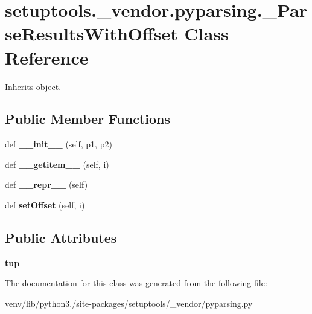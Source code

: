 \hypertarget{classsetuptools_1_1__vendor_1_1pyparsing_1_1___parse_results_with_offset}{}\section{setuptools.\+\_\+vendor.\+pyparsing.\+\_\+\+Parse\+Results\+With\+Offset Class Reference}
\label{classsetuptools_1_1__vendor_1_1pyparsing_1_1___parse_results_with_offset}


Inherits object.

\subsection*{Public Member Functions}
\begin{DoxyCompactItemize}
\item 
\mbox{\label{classsetuptools_1_1__vendor_1_1pyparsing_1_1___parse_results_with_offset_a42a6c67b4d51b835ad4c0813c7542af5}} 
def {\bfseries \+\_\+\+\_\+init\+\_\+\+\_\+} (self, p1, p2)
\item 
\mbox{\label{classsetuptools_1_1__vendor_1_1pyparsing_1_1___parse_results_with_offset_a96b0de38c14f63716fedf3e2b1ffe45e}} 
def {\bfseries \+\_\+\+\_\+getitem\+\_\+\+\_\+} (self, i)
\item 
\mbox{\label{classsetuptools_1_1__vendor_1_1pyparsing_1_1___parse_results_with_offset_a83e1743d828b7eba207b6bc011542792}} 
def {\bfseries \+\_\+\+\_\+repr\+\_\+\+\_\+} (self)
\item 
\mbox{\label{classsetuptools_1_1__vendor_1_1pyparsing_1_1___parse_results_with_offset_af3edd08a032755d17988cef4746177eb}} 
def {\bfseries set\+Offset} (self, i)
\end{DoxyCompactItemize}
\subsection*{Public Attributes}
\begin{DoxyCompactItemize}
\item 
\mbox{\label{classsetuptools_1_1__vendor_1_1pyparsing_1_1___parse_results_with_offset_a3426ca5b82d2d96f39d713952daa6201}} 
{\bfseries tup}
\end{DoxyCompactItemize}


The documentation for this class was generated from the following file\+:\begin{DoxyCompactItemize}
\item 
venv/lib/python3./site-\/packages/setuptools/\+\_\+vendor/pyparsing.\+py\end{DoxyCompactItemize}
